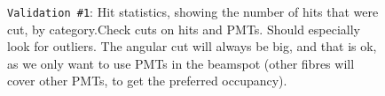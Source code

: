 \documentclass[12pt]{article}
\begin{document}
\begin{figure}
\centering
\noindent{}
  \caption{\centering \texttt{Validation \#1}: Hit statistics, showing the number of hits that were cut, by category.\hspace{\textwidth}Check cuts on hits and PMTs. Should especially look for outliers. The angular cut will always be big, and that is ok, as we only want to use PMTs in the beamspot (other fibres will cover other PMTs, to get the preferred occupancy).}
  \label{fig:val6}
\end{figure}
\end{document}
